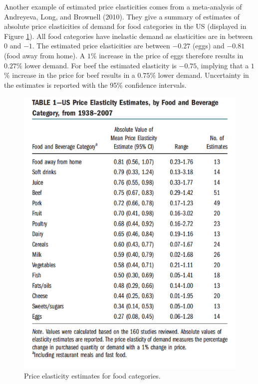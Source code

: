 \documentclass[
]{book}
\begin{document}
Another example of estimated price elasticities comes from a meta-analysis of Andreyeva, Long, and Brownell (2010). They give a summary of estimates of absolute price elasticities of demand for food categories in the US (displayed in Figure \ref{fig:foodelas}). All food categories have inelastic demand as elasticities are in between \(0\) and \(-1\). The estimated price elasticities are between \(-0.27\) (eggs) and \(-0.81\) (food away from home). A \(1\)\% increase in the price of eggs therefore results in \(0.27\)\% lower demand. For beef the estimated elasticity is \(-0.75\), implying that a \(1\)\% increase in the price for beef results in a \(0.75\)\% lower demand. Uncertainty in the estimates is reported with the 95\% confidence intervals.

\begin{figure}

{\centering \includegraphics[width=600px]{./figures/foodelasticities} 

}

\caption{Price elasticity estimates for food categories. }\label{fig:foodelas}
\end{figure}
\end{document}
